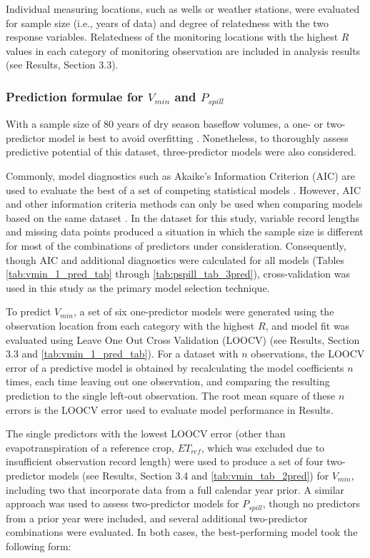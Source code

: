 \documentclass[hess, manuscript]{copernicus}
\begin{document}
Individual measuring locations, such as wells or weather stations, were
evaluated for sample size (i.e., years of data) and degree of
relatedness with the two response variables. Relatedness of the
monitoring locations with the highest $R$ values in each category of
monitoring observation are included in analysis results (see Results,
Section 3.3).

\subsubsection{\texorpdfstring{Prediction formulae for $V_{min}$ and
$P_{spill}$}{Prediction formulae for V\_\{min\} and P\_\{spill\}}}

With a sample size of 80 years of dry season baseflow volumes, a one- or
two-predictor model is best to avoid overfitting \citep{James2013}.
Nonetheless, to thoroughly assess predictive potential of this dataset,
three-predictor models were also considered.

Commonly, model diagnostics such as Akaike's Information Criterion (AIC)
are used to evaluate the best of a set of competing statistical models
\citep{Burnham2004}. However, AIC and other information criteria methods
can only be used when comparing models based on the same dataset
\citep{Burnham2004}. In the dataset for this study, variable record
lengths and missing data points produced a situation in which the sample
size is different for most of the combinations of predictors under
consideration. Consequently, though AIC and additional diagnostics were
calculated for all models (Tables \ref{tab:vmin_1_pred_tab} through
\ref{tab:pspill_tab_3pred}), cross-validation was used in this study as
the primary model selection technique.

To predict $V_{min}$, a set of six one-predictor models were generated
using the observation location from each category with the highest
$R$, and model fit was evaluated using Leave One Out Cross Validation
(LOOCV) \citep{James2013} (see Results, Section 3.3 and
\autoref{tab:vmin_1_pred_tab}). For a dataset with $n$ observations,
the LOOCV error of a predictive model is obtained by recalculating the
model coefficients $n$ times, each time leaving out one observation,
and comparing the resulting prediction to the single left-out
observation. The root mean square of these $n$ errors is the LOOCV
error used to evaluate model performance in Results.

The single predictors with the lowest LOOCV error (other than
evapotranspiration of a reference crop, $ET_{ref}$, which was excluded
due to insufficient observation record length) were used to produce a
set of four two-predictor models (see Results, Section 3.4 and
\autoref{tab:vmin_tab_2pred}) for $V_{min}$, including two that
incorporate data from a full calendar year prior. A similar approach was
used to assess two-predictor models for $P_{spill}$, though no
predictors from a prior year were included, and several additional
two-predictor combinations were evaluated. In both cases, the
best-performing model took the following form:
\end{document}

